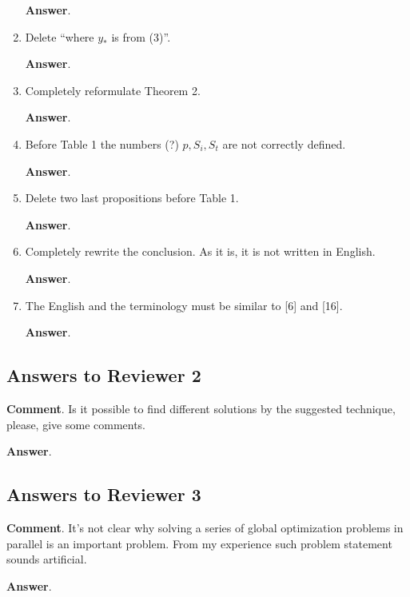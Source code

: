 \documentclass{article}%
\begin{document}
\begin{enumerate}
\textbf{Answer}.

\item  Delete “where $y_*$ is from (3)”.

\textbf{Answer}.

\item  Completely reformulate Theorem 2.

\textbf{Answer}.

\item  Before Table 1 the numbers (?) $p, S_i, S_t$ are not correctly defined.

\textbf{Answer}.

\item  Delete two last propositions before Table 1.

\textbf{Answer}.

\item  Completely rewrite the conclusion. As it is, it is not written in English.

\textbf{Answer}.

\item  The English and the terminology must be similar to [6] and [16].

\textbf{Answer}.

\end{enumerate}



\subsection*{Answers to Reviewer 2}

\textbf{Comment}. Is it possible to find different solutions by the suggested technique, please, give some comments.

\textbf{Answer}.


\subsection*{Answers to Reviewer 3}

\textbf{Comment}. It's not clear why solving a series of global optimization problems in parallel is an important problem. From my experience such problem statement sounds artificial.

\textbf{Answer}.
\end{document}
